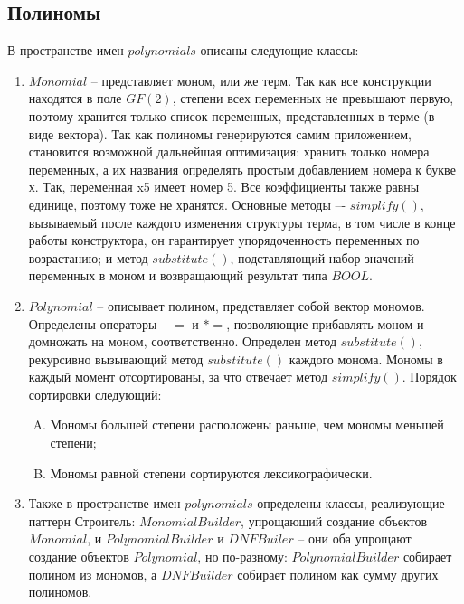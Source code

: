 
\subsection{Полиномы} \label{ch2:subsec-title-abbr} %

В пространстве имен \(polynomials\) описаны следующие классы:
\begin{enumerate}[1.]
	\item \(Monomial\) -- представляет моном, или же терм. Так как все конструкции находятся в поле \(GF(2)\), степени всех переменных не превышают первую, поэтому хранится только список переменных, представленных в терме (в виде вектора). Так как полиномы генерируются самим приложением, становится возможной дальнейшая оптимизация: хранить только номера переменных, а их названия определять простым добавлением номера к букве х. Так, переменная x5 имеет номер 5. Все коэффициенты также равны единице, поэтому тоже не хранятся. Основные методы –- \(simplify()\), вызываемый после каждого изменения структуры терма, в том числе в конце работы конструктора, он гарантирует упорядоченность переменных по возрастанию; и метод \(substitute()\), подставляющий набор значений переменных в моном и возвращающий результат типа \(BOOL\).
	\item \(Polynomial\) -- описывает полином, представляет собой вектор мономов. Определены операторы \(+=\) и \(*=\), позволяющие прибавлять моном и домножать на моном, соответственно. Определен метод \(substitute()\), рекурсивно вызывающий метод \(substitute()\) каждого монома. Мономы в каждый момент отсортированы, за что отвечает метод \(simplify()\). Порядок сортировки следующий:
	\begin{enumerate}[A.]
		\item Мономы большей степени расположены раньше, чем мономы меньшей степени;
		\item Мономы равной степени сортируются лексикографически.
	\end{enumerate} 
	\item Также в пространстве имен \(polynomials\) определены классы, реализующие паттерн Строитель: \(MonomialBuilder\), упрощающий создание объектов \(Monomial\), и \(PolynomialBuilder\) и \(DNFBuiler\) – они оба упрощают создание объектов \(Polynomial\), но по-разному: \(PolynomialBuilder\) собирает полином из мономов, а \(DNFBuilder\) собирает полином как сумму других полиномов.
\end{enumerate} 


